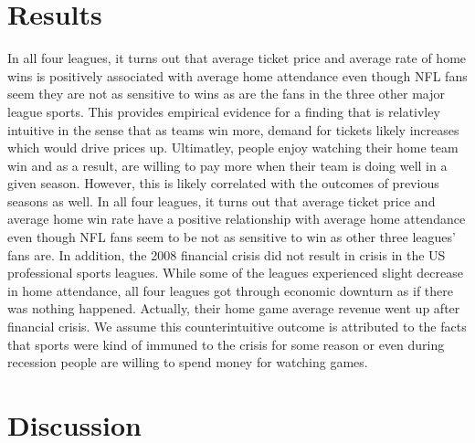 \documentclass[man, fleqn, noextraspace,floatsintext]{apa6}
\begin{document}
\hypertarget{results}{%
\section{Results}\label{results}}

In all four leagues, it turns out that average ticket price and average rate of home wins is positively associated with average home attendance even though NFL fans seem they are not as sensitive to wins as are the fans in the three other major league sports. This provides empirical evidence for a finding that is relativley intuitive in the sense that as teams win more, demand for tickets likely increases which would drive prices up. Ultimatley, people enjoy watching their home team win and as a result, are willing to pay more when their team is doing well in a given season. However, this is likely correlated with the outcomes of previous seasons as well.
In all four leagues, it turns out that average ticket price and average home win rate have a positive relationship with average home attendance even though NFL fans seem to be not as sensitive to win as other three leagues' fans are. In addition, the 2008 financial crisis did not result in crisis in the US professional sports leagues. While some of the leagues experienced slight decrease in home attendance, all four leagues got through economic downturn as if there was nothing happened. Actually, their home game average revenue went up after financial crisis. We assume this counterintuitive outcome is attributed to the facts that sports were kind of immuned to the crisis for some reason or even during recession people are willing to spend money for watching games.

\hypertarget{discussion}{%
\section{Discussion}\label{discussion}}
\end{document}
